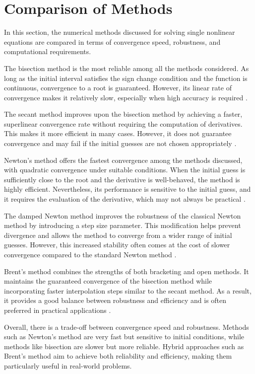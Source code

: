 \section{Comparison of Methods}

In this section, the numerical methods discussed for solving single nonlinear equations are compared in terms of convergence speed, robustness, and computational requirements.

The bisection method is the most reliable among all the methods considered. As long as the initial interval satisfies the sign change condition and the function is continuous, convergence to a root is guaranteed. However, its linear rate of convergence makes it relatively slow, especially when high accuracy is required \cite{burden, atkinson}.

The secant method improves upon the bisection method by achieving a faster, superlinear convergence rate without requiring the computation of derivatives. This makes it more efficient in many cases. However, it does not guarantee convergence and may fail if the initial guesses are not chosen appropriately \cite{kelley}.

Newton's method offers the fastest convergence among the methods discussed, with quadratic convergence under suitable conditions. When the initial guess is sufficiently close to the root and the derivative is well-behaved, the method is highly efficient. Nevertheless, its performance is sensitive to the initial guess, and it requires the evaluation of the derivative, which may not always be practical \cite{burden, kelley}.

The damped Newton method improves the robustness of the classical Newton method by introducing a step size parameter. This modification helps prevent divergence and allows the method to converge from a wider range of initial guesses. However, this increased stability often comes at the cost of slower convergence compared to the standard Newton method \cite{kelley}.

Brent's method combines the strengths of both bracketing and open methods. It maintains the guaranteed convergence of the bisection method while incorporating faster interpolation steps similar to the secant method. As a result, it provides a good balance between robustness and efficiency and is often preferred in practical applications \cite{chapra, cs357}.

Overall, there is a trade-off between convergence speed and robustness. Methods such as Newton's method are very fast but sensitive to initial conditions, while methods like bisection are slower but more reliable. Hybrid approaches such as Brent's method aim to achieve both reliability and efficiency, making them particularly useful in real-world problems.